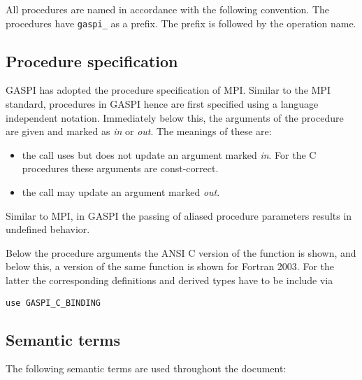 \documentclass[a4paper]{article}
\newlength{\st}\setlength{\st}{0pt}
\newcommand{\zsep}[1]{#1}
\newcommand{\gaspiprefix}{gaspi}
\newcommand{\function}[1]{{\tt #1}}
\newcommand{\gaspifunction}[1]{\function{\protect\zsep{\gaspiprefix\_#1}}}
\newenvironment{cbox}[1]
{\newcommand\colboxcolor{#1}\begin{lrbox}{\riddlebox}\begin{minipage}{\dimexpr\columnwidth-2\fboxsep\relax}}
{\end{minipage}\end{lrbox}\begin{center}\colorbox[HTML]{\colboxcolor}{\usebox{\riddlebox}}\end{center}}
\newenvironment{FDefSign}{\begin{cbox}{EEEEEE}}{\end{cbox}}
\begin{document}
All procedures are named in accordance with the following convention.
The procedures have \gaspifunction{} as a prefix. The prefix is
followed by the operation name.

\subsection{Procedure specification}

GASPI has adopted the procedure specification of MPI. Similar to the
MPI standard, procedures in GASPI hence are first specified using a
language independent notation.  Immediately below this, the arguments
of the procedure are given and marked as \textit{in} or
\textit{out}. The meanings of 
these are:

\begin{itemize}
\item the call uses but does not update an argument marked \textit{in}. For the C procedures these arguments are const-correct.
\item the call may update an argument marked \textit{out}.
\end{itemize}

Similar to MPI, in GASPI the passing of aliased procedure parameters
results in undefined behavior.

Below the procedure arguments the ANSI C version of the function is
shown, and below this, a version of the same function is shown for
Fortran 2003. For the latter the corresponding definitions and derived
types have to be include via

\begin{FDefSign}
\begin{verbatim}
use GASPI_C_BINDING
\end{verbatim}
\end{FDefSign}



\subsection{Semantic terms}

The following semantic terms are used throughout the document:

\newcommand{\septext}{0.5em}
\newcommand{\gentextwithline}[6]{
\draw (#2,#3) node[left] {#1};
\draw[#6] (#2+\septext+#4,#3) -- +(#5,0);
}
\newcommand{\timeline}[1]{\gentextwithline{Time}{0}{#1}{0}{25em}{->,dashed}}
\newcommand{\operation}[2]{\gentextwithline{Operation}{0}{#1}{1em}{#2}{|-|}}
\newcommand{\gencall}[3]{\gentextwithline{#1}{0}{#2}{0}{#3}{|-|}}
\newcommand{\call}[2]{\gencall{Call}{#1}{#2}}
\newcommand{\calls}[2]{\gencall{Calls}{#1}{#2-10em};
\draw[|-|] (#2-8em,#1) -- +(8em,0);
}
\newcommand{\wait}[3]{\gentextwithline{Wait}{#1}{#2}{0}{#3}{|-|}}
\newcommand{\progress}[2]{\gentextwithline{Progress}{0}{#1}{1em}{#2}{|-|}}
\end{document}
